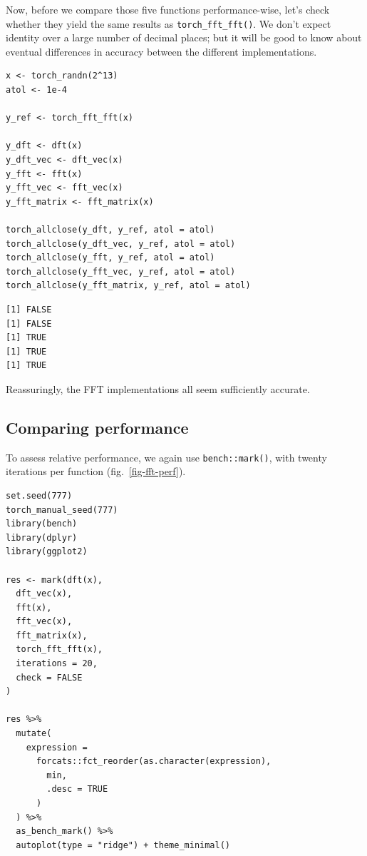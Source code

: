 \documentclass[
  letterpaper,
]{krantz}
\begin{document}
Now, before we compare those five functions performance-wise, let's
check whether they yield the same results as \texttt{torch\_fft\_fft()}.
We don't expect identity over a large number of decimal places; but it
will be good to know about eventual differences in accuracy between the
different implementations.

\begin{verbatim}
x <- torch_randn(2^13)
atol <- 1e-4

y_ref <- torch_fft_fft(x)

y_dft <- dft(x)
y_dft_vec <- dft_vec(x)
y_fft <- fft(x)
y_fft_vec <- fft_vec(x)
y_fft_matrix <- fft_matrix(x)

torch_allclose(y_dft, y_ref, atol = atol)
torch_allclose(y_dft_vec, y_ref, atol = atol)
torch_allclose(y_fft, y_ref, atol = atol)
torch_allclose(y_fft_vec, y_ref, atol = atol)
torch_allclose(y_fft_matrix, y_ref, atol = atol)
\end{verbatim}

\begin{verbatim}
[1] FALSE
[1] FALSE
[1] TRUE
[1] TRUE
[1] TRUE
\end{verbatim}

Reassuringly, the FFT implementations all seem sufficiently accurate.

\hypertarget{comparing-performance}{%
\subsection{Comparing performance}\label{comparing-performance}}

To assess relative performance, we again use \texttt{bench::mark()},
with twenty iterations per function (fig.~\ref{fig-fft-perf}).

\begin{verbatim}
set.seed(777)
torch_manual_seed(777)
library(bench)
library(dplyr)
library(ggplot2)

res <- mark(dft(x),
  dft_vec(x),
  fft(x),
  fft_vec(x),
  fft_matrix(x),
  torch_fft_fft(x),
  iterations = 20,
  check = FALSE
)

res %>%
  mutate(
    expression =
      forcats::fct_reorder(as.character(expression),
        min,
        .desc = TRUE
      )
  ) %>%
  as_bench_mark() %>%
  autoplot(type = "ridge") + theme_minimal()
\end{verbatim}
\end{document}
